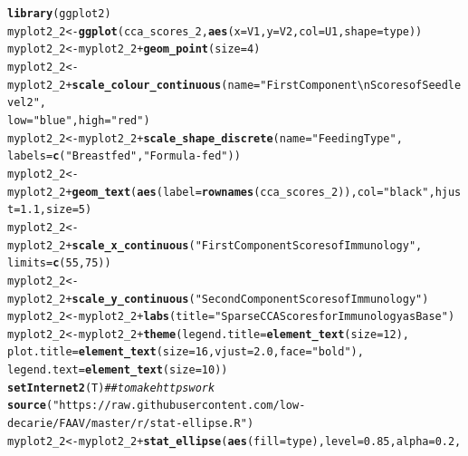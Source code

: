 \documentclass[12pt]{article}\usepackage[]{graphicx}\usepackage[]{color}
\makeatletter
\newcommand{\hlnum}[1]{\textcolor[rgb]{0.686,0.059,0.569}{#1}}%
\newcommand{\hlstr}[1]{\textcolor[rgb]{0.192,0.494,0.8}{#1}}%
\newcommand{\hlcom}[1]{\textcolor[rgb]{0.678,0.584,0.686}{\textit{#1}}}%
\newcommand{\hlopt}[1]{\textcolor[rgb]{0,0,0}{#1}}%
\newcommand{\hlstd}[1]{\textcolor[rgb]{0.345,0.345,0.345}{#1}}%
\newcommand{\hlkwb}[1]{\textcolor[rgb]{0.69,0.353,0.396}{#1}}%
\newcommand{\hlkwc}[1]{\textcolor[rgb]{0.333,0.667,0.333}{#1}}%
\newcommand{\hlkwd}[1]{\textcolor[rgb]{0.737,0.353,0.396}{\textbf{#1}}}%
\newenvironment{kframe}{%
 \def\at@end@of@kframe{}%
 \ifinner\ifhmode%
  \def\at@end@of@kframe{\end{minipage}}%
  \begin{minipage}{\columnwidth}%
 \fi\fi%
 \def\FrameCommand##1{\hskip\@totalleftmargin \hskip-\fboxsep
 \colorbox{shadecolor}{##1}\hskip-\fboxsep
     \hskip-\linewidth \hskip-\@totalleftmargin \hskip\columnwidth}%
 \MakeFramed {\advance\hsize-\width
   \@totalleftmargin\z@ \linewidth\hsize
   \@setminipage}}%
 {\par\unskip\endMakeFramed%
 \at@end@of@kframe}
\newenvironment{knitrout}{}{} %
\makeatother
\begin{document}
\begin{knitrout}
\begin{kframe}
\begin{alltt}
\hlkwd{library}\hlstd{(ggplot2)}
\hlstd{myplot2_2}\hlkwb{<-}\hlkwd{ggplot}\hlstd{(cca_scores_2,}\hlkwd{aes}\hlstd{(}\hlkwc{x}\hlstd{=V1,}\hlkwc{y}\hlstd{=V2,}\hlkwc{col}\hlstd{=U1,}\hlkwc{shape}\hlstd{=type))}
\hlstd{myplot2_2}\hlkwb{<-}\hlstd{myplot2_2}\hlopt{+}\hlkwd{geom_point}\hlstd{(}\hlkwc{size}\hlstd{=}\hlnum{4}\hlstd{)}
\hlstd{myplot2_2}\hlkwb{<-}\hlstd{myplot2_2}\hlopt{+}\hlkwd{scale_colour_continuous}\hlstd{(}\hlkwc{name}\hlstd{=}\hlstr{"First Component\textbackslash{}nScores of Seedlevel2"}\hlstd{,}
                                         \hlkwc{low}\hlstd{=}\hlstr{"blue"}\hlstd{,}\hlkwc{high}\hlstd{=}\hlstr{"red"}\hlstd{)}
\hlstd{myplot2_2}\hlkwb{<-}\hlstd{myplot2_2}\hlopt{+}\hlkwd{scale_shape_discrete}\hlstd{(}\hlkwc{name}\hlstd{=}\hlstr{"Feeding Type"}\hlstd{,}
                                      \hlkwc{labels}\hlstd{=}\hlkwd{c}\hlstd{(}\hlstr{"Breastfed"}\hlstd{,}\hlstr{"Formula-fed"}\hlstd{))}
\hlstd{myplot2_2}\hlkwb{<-}\hlstd{myplot2_2}\hlopt{+}\hlkwd{geom_text}\hlstd{(}\hlkwd{aes}\hlstd{(}\hlkwc{label}\hlstd{=}\hlkwd{rownames}\hlstd{(cca_scores_2)),}\hlkwc{col}\hlstd{=}\hlstr{"black"}\hlstd{,}\hlkwc{hjust}\hlstd{=}\hlnum{1.1}\hlstd{,}\hlkwc{size}\hlstd{=}\hlnum{5}\hlstd{)}
\hlstd{myplot2_2}\hlkwb{<-}\hlstd{myplot2_2}\hlopt{+}\hlkwd{scale_x_continuous}\hlstd{(}\hlstr{"First Component Scores of Immunology"}\hlstd{,}
                                        \hlkwc{limits}\hlstd{=}\hlkwd{c}\hlstd{(}\hlnum{55}\hlstd{,}\hlnum{75}\hlstd{))}
\hlstd{myplot2_2}\hlkwb{<-}\hlstd{myplot2_2}\hlopt{+}\hlkwd{scale_y_continuous}\hlstd{(}\hlstr{"Second Component Scores of Immunology"}\hlstd{)}
\hlstd{myplot2_2}\hlkwb{<-}\hlstd{myplot2_2}\hlopt{+}\hlkwd{labs}\hlstd{(}\hlkwc{title}\hlstd{=}\hlstr{"Sparse CCA Scores for Immunology as Base"}\hlstd{)}
\hlstd{myplot2_2}\hlkwb{<-}\hlstd{myplot2_2}\hlopt{+}\hlkwd{theme}\hlstd{(}\hlkwc{legend.title} \hlstd{=} \hlkwd{element_text}\hlstd{(}\hlkwc{size}\hlstd{=}\hlnum{12}\hlstd{),}
                       \hlkwc{plot.title} \hlstd{=} \hlkwd{element_text}\hlstd{(}\hlkwc{size}\hlstd{=}\hlnum{16}\hlstd{,}\hlkwc{vjust}\hlstd{=}\hlnum{2.0}\hlstd{,} \hlkwc{face}\hlstd{=}\hlstr{"bold"}\hlstd{),}
                       \hlkwc{legend.text}\hlstd{=}\hlkwd{element_text}\hlstd{(}\hlkwc{size}\hlstd{=}\hlnum{10}\hlstd{))}
\hlkwd{setInternet2}\hlstd{(T)} \hlcom{## to make https work}
\hlkwd{source}\hlstd{(}\hlstr{"https://raw.githubusercontent.com/low-decarie/FAAV/master/r/stat-ellipse.R"}\hlstd{)}
\hlstd{myplot2_2}\hlkwb{<-}\hlstd{myplot2_2}\hlopt{+}\hlkwd{stat_ellipse}\hlstd{(}\hlkwd{aes}\hlstd{(}\hlkwc{fill}\hlstd{=type),}\hlkwc{level}\hlstd{=}\hlnum{0.85}\hlstd{,}\hlkwc{alpha}\hlstd{=}\hlnum{0.2}\hlstd{,}

\end{alltt}
\end{kframe}
\end{knitrout}
\end{document}
